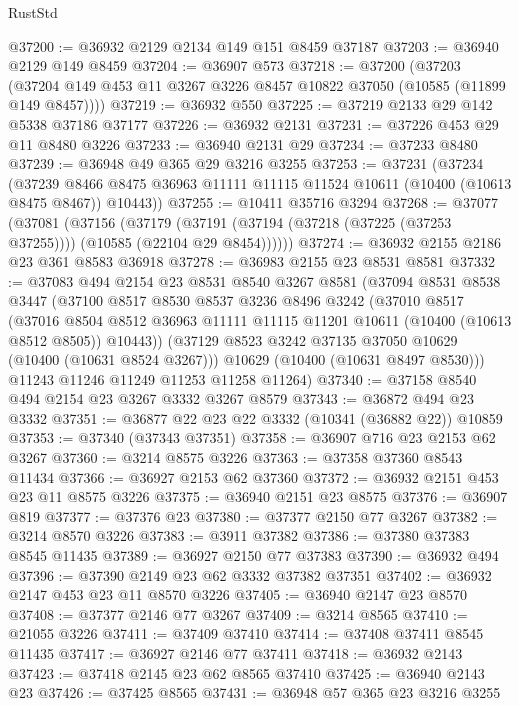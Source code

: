 \begin{lexlean}{RustStd}
\begin{coremodule}
@37200 := @36932 @2129 @2134 @149 @151 @8459 @37187
@37203 := @36940 @2129 @149 @8459
@37204 := @36907 @573
@37218 := @37200
    (@37203 (@37204 @149 @453 @11 @3267 @3226 @8457 @10822 @37050 (@10585 (@11899 @149 @8457))))
@37219 := @36932 @550
@37225 := @37219 @2133 @29 @142 @5338 @37186 @37177
@37226 := @36932 @2131
@37231 := @37226 @453 @29 @11 @8480 @3226
@37233 := @36940 @2131 @29
@37234 := @37233 @8480
@37239 := @36948 @49 @365 @29 @3216 @3255
@37253 := @37231
    (@37234
      (@37239 @8466 @8475 @36963 @11111 @11115 @11524 @10611 (@10400 (@10613 @8475 @8467)) @10443))
@37255 := @10411 @35716 @3294
@37268 := @37077
    (@37081
      (@37156
        (@37179 (@37191 (@37194 (@37218 (@37225 (@37253 @37255)))) (@10585 (@22104 @29 @8454))))))
@37274 := @36932 @2155 @2186 @23 @361 @8583 @36918
@37278 := @36983 @2155 @23 @8531 @8581
@37332 := @37083
    @494
    @2154
    @23
    @8531
    @8540
    @3267
    @8581
    (@37094
      @8531
      @8538
      @3447
      (@37100
        @8517
        @8530
        @8537
        @3236
        @8496
        @3242
        (@37010
          @8517
          (@37016
            @8504
            @8512
            @36963
            @11111
            @11115
            @11201
            @10611
            (@10400 (@10613 @8512 @8505))
            @10443))
        (@37129 @8523 @3242 @37135 @37050 @10629 (@10400 (@10631 @8524 @3267)))
        @10629
        (@10400 (@10631 @8497 @8530)))
      @11243
      @11246
      @11249
      @11253
      @11258
      @11264)
@37340 := @37158 @8540 @494 @2154 @23 @3267 @3332 @3267 @8579
@37343 := @36872 @494 @23 @3332
@37351 := @36877 @22 @23 @22 @3332 (@10341 (@36882 @22)) @10859
@37353 := @37340 (@37343 @37351)
@37358 := @36907 @716 @23 @2153 @62 @3267
@37360 := @3214 @8575 @3226
@37363 := @37358 @37360 @8543 @11434
@37366 := @36927 @2153 @62 @37360
@37372 := @36932 @2151 @453 @23 @11 @8575 @3226
@37375 := @36940 @2151 @23 @8575
@37376 := @36907 @819
@37377 := @37376 @23
@37380 := @37377 @2150 @77 @3267
@37382 := @3214 @8570 @3226
@37383 := @3911 @37382
@37386 := @37380 @37383 @8545 @11435
@37389 := @36927 @2150 @77 @37383
@37390 := @36932 @494
@37396 := @37390 @2149 @23 @62 @3332 @37382 @37351
@37402 := @36932 @2147 @453 @23 @11 @8570 @3226
@37405 := @36940 @2147 @23 @8570
@37408 := @37377 @2146 @77 @3267
@37409 := @3214 @8565
@37410 := @21055 @3226
@37411 := @37409 @37410
@37414 := @37408 @37411 @8545 @11435
@37417 := @36927 @2146 @77 @37411
@37418 := @36932 @2143
@37423 := @37418 @2145 @23 @62 @8565 @37410
@37425 := @36940 @2143 @23
@37426 := @37425 @8565
@37431 := @36948 @57 @365 @23 @3216 @3255

\end{coremodule}
\end{lexlean}
